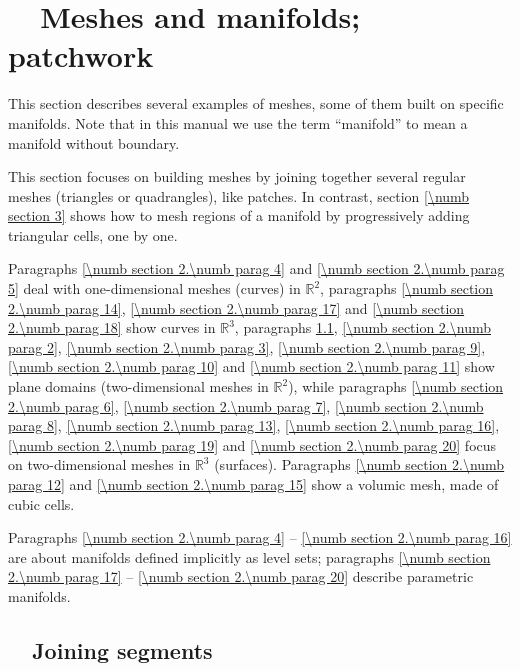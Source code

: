 
\chapter{~~Meshes and manifolds; patchwork}\label{\numb section 2}

This section describes several examples of meshes, some of them built on specific manifolds.
Note that in this manual we use the term ``manifold'' to mean a manifold without boundary.

This section focuses on building meshes by joining together several regular meshes
(triangles or quadrangles), like patches.
In contrast, section \ref{\numb section 3} shows how to mesh regions of a manifold
by progressively adding triangular cells, one by one.

Paragraphs \ref{\numb section 2.\numb parag 4} and \ref{\numb section 2.\numb parag 5}
deal with one-dimensional meshes (curves) in $ \mathbb{R}^2 $,
paragraphs \ref{\numb section 2.\numb parag 14}, \ref{\numb section 2.\numb parag 17} and
\ref{\numb section 2.\numb parag 18} show curves in $ \mathbb{R}^3 $,
paragraphs \ref{\numb section 2.\numb parag 1}, \ref{\numb section 2.\numb parag 2},
\ref{\numb section 2.\numb parag 3}, \ref{\numb section 2.\numb parag 9},
\ref{\numb section 2.\numb parag 10} and \ref{\numb section 2.\numb parag 11} show plane domains
(two-dimensional meshes in $ \mathbb{R}^2 $),
while paragraphs \ref{\numb section 2.\numb parag 6}, \ref{\numb section 2.\numb parag 7},
\ref{\numb section 2.\numb parag 8}, \ref{\numb section 2.\numb parag 13},
\ref{\numb section 2.\numb parag 16}, \ref{\numb section 2.\numb parag 19} and
\ref{\numb section 2.\numb parag 20} focus on two-dimensional meshes
in $ \mathbb{R}^3 $ (surfaces).
Paragraphs \ref{\numb section 2.\numb parag 12} and \ref{\numb section 2.\numb parag 15} show
a volumic mesh, made of cubic cells.

Paragraphs \ref{\numb section 2.\numb parag 4} -- \ref{\numb section 2.\numb parag 16}
are about manifolds defined implicitly as level sets;
paragraphs \ref{\numb section 2.\numb parag 17} -- \ref{\numb section 2.\numb parag 20}
describe parametric manifolds.


\section{~~Joining segments}\label{\numb section 2.\numb parag 1}

